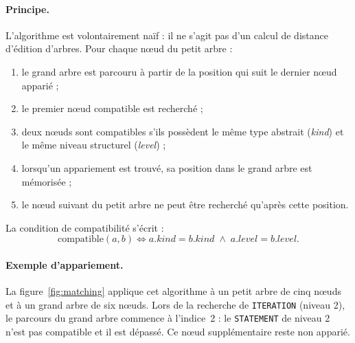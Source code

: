 \documentclass[12pt,a4paper,oneside]{report}
\begin{document}
\paragraph{Principe.}
L'algorithme est volontairement naïf : il ne s'agit pas d'un calcul de
distance d'édition d'arbres. Pour chaque nœud du petit arbre :
\begin{enumerate}
  \item le grand arbre est parcouru à partir de la position qui suit le
        dernier nœud apparié ;
  \item le premier nœud compatible est recherché ;
  \item deux nœuds sont compatibles s'ils possèdent le même type abstrait
        (\emph{kind}) et le même niveau structurel (\emph{level}) ;
  \item lorsqu'un appariement est trouvé, sa position dans le grand arbre est
        mémorisée ;
  \item le nœud suivant du petit arbre ne peut être recherché qu'après cette
        position.
\end{enumerate}

La condition de compatibilité s'écrit :
\begin{equation}
\mathrm{compatible}(a,b) \iff a.\mathit{kind} = b.\mathit{kind}
\;\wedge\; a.\mathit{level} = b.\mathit{level}.
\end{equation}


\paragraph{Exemple d'appariement.}
La figure~\ref{fig:matching} applique cet algorithme à un petit arbre de cinq
nœuds et à un grand arbre de six nœuds. Lors de la recherche de
\texttt{ITERATION} (niveau 2), le parcours du grand arbre commence à
l'indice~2 : le \texttt{STATEMENT} de niveau 2 n'est pas compatible et il est
dépassé. Ce nœud supplémentaire reste non apparié.
\end{document}
